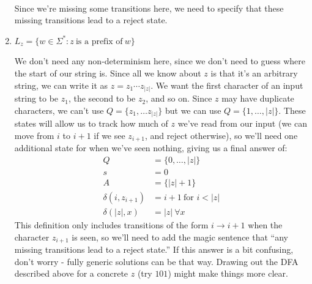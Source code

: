 \documentclass[fleqn]{article}
\begin{document}
\begin{enumerate}
\begin{answer}
 \\
        Since we're missing some transitions here, we need to specify that these missing transitions lead to a reject state.
    \end{answer}
    \item $L_z = \{w \in \Sigma^* : z~\text{is a prefix of}~w\}$
    \begin{answer}
        We don't need any non-determinism here, since we don't need to guess where the start of our string is. Since all we know about $z$ is that it's an arbitrary string, we can write it as $z = z_1\cdots z_{|z|}$. We want the first character of an input string to be $z_1$, the second to be $z_2$, and so on. Since $z$ may have duplicate characters, we can't use $Q = \{z_1,\dots z_{|z|}\}$ but we can use $Q = \{1, \dots, |z|\}$. These states will allow us to track how much of $z$ we've read from our input (we can move from $i$ to $i+1$ if we see $z_{i+1}$, and reject otherwise), so we'll need one additional state for when we've seen nothing, giving us a final answer of:
        \[
            \begin{aligned}
                Q &= \{0,\dots,|z|\} \\
                s &= 0 \\
                A &= \{|z| + 1\} \\
                \delta(i, z_{i+1}) &= i + 1 ~\text{for } i < |z| \\
                \delta(|z|, x) &= |z| ~\forall x
            \end{aligned}
        \]
        This definition only includes transitions of the form $i \to i+1$ when the character $z_{i+1}$ is seen, so we'll need to add the magic sentence that ``any missing transitions lead to a reject state.'' If this answer is a bit confusing, don't worry - fully generic solutions can be that way. Drawing out the DFA described above for a concrete $z$ (try $101$) might make things more clear.
    \end{answer}
\end{enumerate}
\end{document}
